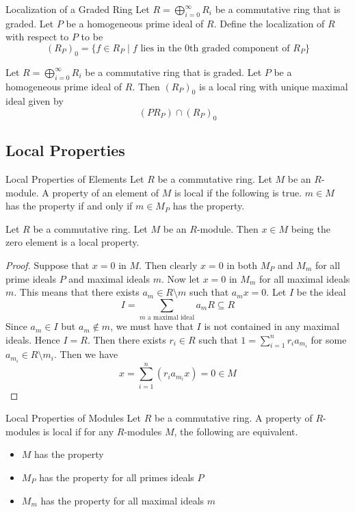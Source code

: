 \documentclass[a4paper]{article}
\begin{document}
\begin{defn}{Localization of a Graded Ring}{} Let $R=\bigoplus_{i=0}^\infty R_i$ be a commutative ring that is graded. Let $P$ be a homogeneous prime ideal of $R$. Define the localization of $R$ with respect to $P$ to be $$(R_P)_0=\{f\in R_P\;|\;f\text{ lies in the }0\text{th graded component of }R_P\}$$
\end{defn}

\begin{prp}{}{} Let $R=\bigoplus_{i=0}^\infty R_i$ be a commutative ring that is graded. Let $P$ be a homogeneous prime ideal of $R$. Then $(R_P)_0$ is a local ring with unique maximal ideal given by $$(PR_P)\cap(R_P)_0$$
\end{prp}

\subsection{Local Properties}
\begin{defn}{Local Properties of Elements}{} Let $R$ be a commutative ring. Let $M$ be an $R$-module. A property of an element of $M$ is local if the following is true. $m\in M$ has the property if and only if $m\in M_P$ has the property. 
\end{defn}

\begin{lmm}{}{} Let $R$ be a commutative ring. Let $M$ be an $R$-module. Then $x\in M$ being the zero element is a local property. \tcbline
\begin{proof}
Suppose that $x=0$ in $M$. Then clearly $x=0$ in both $M_P$ and $M_m$ for all prime ideals $P$ and maximal ideals $m$. Now let $x=0$ in $M_m$ for all maximal ideals $m$. This means that there exists $a_m\in R\setminus m$ such that $a_mx=0$. Let $I$ be the ideal $$I=\sum_{m\text{ a maximal ideal}}a_mR\subseteq R$$ Since $a_m\in I$ but $a_m\notin m$, we must have that $I$ is not contained in any maximal ideals. Hence $I=R$. Then there exists $r_i\in R$ such that $1=\sum_{i=1}^nr_ia_{m_i}$ for some $a_{m_i}\in R\setminus m_i$. Then we have $$x=\sum_{i=1}^n(r_ia_{m_i}x)=0\in M$$
\end{proof}
\end{lmm}

\begin{defn}{Local Properties of Modules}{} Let $R$ be a commutative ring. A property of $R$-modules is local if for any $R$-modules $M$, the following are equivalent. 
\begin{itemize}
\item $M$ has the property
\item $M_P$ has the property for all primes ideals $P$
\item $M_m$ has the property for all maximal ideals $m$
\end{itemize}
\end{defn}
\end{document}
